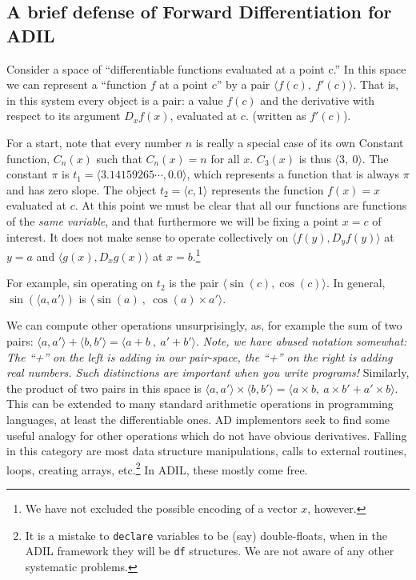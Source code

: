 \documentclass{article}
\begin{document}
{\subsection{A brief defense of Forward Differentiation for ADIL}

Consider a space of ``differentiable functions evaluated at a point
c.''  In this space we can represent a ``function $f$ at a point $c$''
by a pair $\langle f(c),~ f'(c)\rangle$.  That is, in this system
every object is a pair: a value $f(c)$ and the derivative with respect
to its argument $D_x f(x)$, evaluated at $c$.  (written as $f'(c)$).

For a start, note that every number $n$ is really a special case of
its own Constant function, $C_n(x)$ such that $C_n(x) = n$ for all
$x$.  $C_3(x)$ is thus $\langle3,~ 0\rangle$.  The constant $\pi$ is
$t_1 = \langle 3.14159265\cdots, 0.0\rangle$, which represents a
function that is always $\pi$ and has zero slope.  The object
$t_2=\langle c,1\rangle $ represents the function $f(x)=x$ evaluated
at $c$. At this point we must be clear that all our functions are
functions of the {\em same variable}, and that furthermore we will be fixing
a point $x=c$ of interest.  It does not make sense to operate
collectively on $\langle f(y),D_y f(y)\rangle$ at $y=a$ and $\langle
g(x),D_x g(x)\rangle$ at $x=b$.\footnote{We have not excluded the possible
encoding of a vector $x$, however.}

For example, sin operating on $t_2$ is the pair $\langle \sin(c),
\cos(c)\rangle$.  In general, $\sin(\langle a, a'\rangle)$ is $\langle
\sin(a)~,~\cos(a) \times a'\rangle$.

We can compute other operations unsurprisingly, as, for example the
sum of two pairs: $\langle a ,a'\rangle + \langle b , b'\rangle =
\langle a+b ~,~a'+b'\rangle.  $ {\em Note, we have abused notation
somewhat: The ``+'' on the left is adding in our pair-space, the ``+''
on the right is adding real numbers. Such distinctions are important
when you write programs!}  Similarly, the product of two pairs in this
space is $\langle a ,a'\rangle \times \langle b , b'\rangle = \langle
a \times b ,~ a\times b' + a' \times b \rangle.  $ This can be
extended to many standard arithmetic operations in programming
languages, at least the differentiable ones\cite{Griewank91}.  AD
implementors seek to find some useful analogy for other operations
which do not have obvious derivatives.  Falling in this category are
most data structure manipulations, calls to external routines, loops,
creating arrays, etc.\footnote{It is a mistake to {\tt declare}
variables to be (say) double-floats, when in the ADIL framework they
will be {\tt df} structures. We are not aware of any other systematic
problems.}  In ADIL, these mostly come free.}
\end{document}
